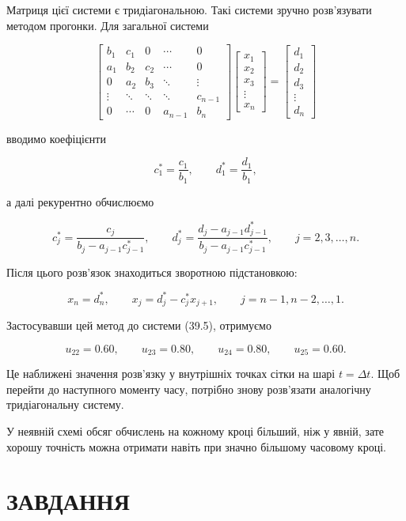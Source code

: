 \documentclass[
  ukrainian,
]{article}
\begin{document}
Матриця цієї системи є тридіагональною. Такі системи зручно розв'язувати
методом прогонки. Для загальної системи

\[\begin{bmatrix}b_1 & c_1 & 0 & \cdots & 0\\a_1 & b_2 & c_2 & \cdots & 0\\0 & a_2 & b_3 & \ddots & \vdots\\\vdots & \ddots & \ddots & \ddots & c_{n-1}\\0 & \cdots & 0 & a_{n-1} & b_n\end{bmatrix}\begin{bmatrix}x_1\\x_2\\x_3\\\vdots\\x_n\end{bmatrix}=\begin{bmatrix}d_1\\d_2\\d_3\\\vdots\\d_n\end{bmatrix}\]

вводимо коефіцієнти

\[c_1^*=\frac{c_1}{b_1},\qquad d_1^*=\frac{d_1}{b_1},\]

а далі рекурентно обчислюємо

\[c_j^*=\frac{c_j}{b_j-a_{j-1}c_{j-1}^*},\qquad d_j^*=\frac{d_j-a_{j-1}d_{j-1}^*}{b_j-a_{j-1}c_{j-1}^*},\qquad j=2,3,\dots,n.\]

Після цього розв'язок знаходиться зворотною підстановкою:

\[x_n=d_n^*,\qquad x_j=d_j^*-c_j^*x_{j+1},\qquad j=n-1,n-2,\dots,1.\]

Застосувавши цей метод до системи (39.5), отримуємо

\[u_{22}=0.60,\qquad u_{23}=0.80,\qquad u_{24}=0.80,\qquad u_{25}=0.60.\]

Це наближені значення розв'язку у внутрішніх точках сітки на шарі
\(t=\Delta t\). Щоб перейти до наступного моменту часу, потрібно знову
розв'язати аналогічну тридіагональну систему.

У неявній схемі обсяг обчислень на кожному кроці більший, ніж у явній,
зате хорошу точність можна отримати навіть при значно більшому часовому
кроці.

\section{ЗАВДАННЯ}\label{ux437ux430ux432ux434ux430ux43dux43dux44f-22}
\end{document}
